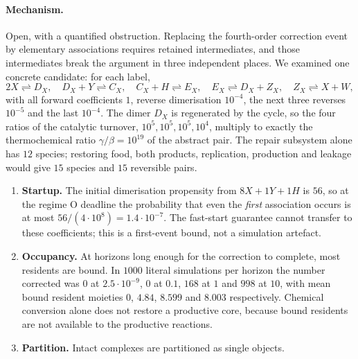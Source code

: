 \documentclass[11pt,a4paper]{article}
\theoremstyle{plain}
\theoremstyle{definition}
\theoremstyle{remark}
\begin{document}
\paragraph{Mechanism.}\label{sec:elementary} Open, with a quantified obstruction. Replacing the fourth-order
correction event by elementary associations requires retained intermediates, and those
intermediates break the argument in three independent places. We examined one concrete
candidate: for each label,
\begin{equation}
2X\rightleftharpoons D_X,\quad D_X+Y\rightleftharpoons C_X,\quad
C_X+H\rightleftharpoons E_X,\quad E_X\rightleftharpoons D_X+Z_X,\quad
Z_X\rightleftharpoons X+W,\label{eq:elementary}
\end{equation}
with all forward coefficients $1$, reverse dimerisation $10^{-4}$, the next three
reverses $10^{-5}$ and the last $10^{-4}$. The dimer $D_X$ is regenerated by the cycle,
so the four ratios of the catalytic turnover, $10^{5},10^{5},10^{5},10^{4}$, multiply to
exactly the thermochemical ratio $\gamma/\beta=10^{19}$ of the abstract pair. The
repair subsystem alone has $12$ species; restoring food, both products, replication,
production and leakage would give $15$ species and $15$ reversible pairs.

\begin{enumerate}[label=(\alph*),leftmargin=2.2em]
\item \textbf{Startup.} The initial dimerisation propensity from $8X+1Y+1H$ is $56$, so at
  the regime O deadline the probability that even the \emph{first} association occurs is
  at most $56/(4\cdot10^{8})=1.4\cdot10^{-7}$. The fast-start guarantee cannot transfer to
  these coefficients; this is a first-event bound, not a simulation artefact.
\item \textbf{Occupancy.} At horizons long enough for the correction to complete, most
  residents are bound. In $1000$ literal simulations per horizon the number corrected was
  $0$ at $2.5\cdot10^{-9}$, $0$ at $0.1$, $168$ at $1$ and $998$ at $10$, with mean bound
  resident moieties $0$, $4.84$, $8.599$ and $8.003$ respectively. Chemical conversion
  alone does not restore a productive core, because bound residents are not available to
  the productive reactions.
\item \textbf{Partition.} Intact complexes are partitioned as single objects.
\end{enumerate}
\end{document}
